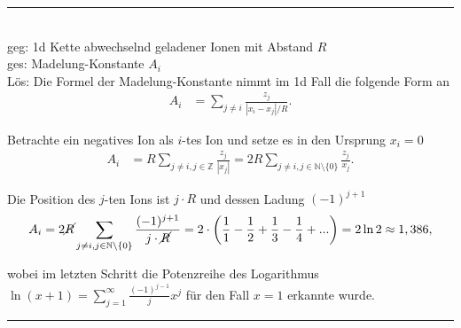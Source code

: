 \documentclass{article}
\newcommand{\lr}[1]{\left(#1\right)}
\begin{document}
{\color{blue}
\hrule
	\\
	geg: 1d Kette abwechselnd geladener Ionen mit Abstand $R$ \\
	ges: Madelung-Konstante $A_i$ \\
	Lös: Die Formel der Madelung-Konstante nimmt im 1d Fall die folgende Form an
		\begin{align*}
			A_i &= \sum_{j \neq i} \frac{z_j}{|x_i - x_j|/R}.
		\end{align*}
	
	Betrachte ein negatives Ion als $i$-tes Ion und setze es in den Ursprung $x_i = 0$
		\begin{align*}
			A_i &= R \sum_{j \neq i, j \in \mathbb{Z}} \frac{z_j}{|x_j|} = 2R \sum_{j \neq i, j \in \mathbb{N} \setminus \{0\}} \frac{z_j}{x_j}.
		\end{align*}
	
	Die Position des $j$-ten Ions ist $j \cdot R$ und dessen Ladung $(-1)^{j+1}$
		\begin{align*}
			A_i = 2 \cancel{R} \sum_{j \neq i, j \in \mathbb{N} \setminus \{0\}} \frac{(-1)^{j+1}}{j \cdot \cancel{R}} = 2 \cdot \lr{ \frac{1}{1} - \frac{1}{2} + \frac{1}{3} - \frac{1}{4} + ... } = 2 \ln 2 \approx 1,386,
		\end{align*}

	wobei im letzten Schritt die Potenzreihe des Logarithmus $\ln (x + 1) = \sum_{j=1}^\infty \frac{(-1)^{j-1}}{j} x^j$ für den Fall $x=1$ erkannte wurde.
\hrule
}


\newpage
\end{document}
